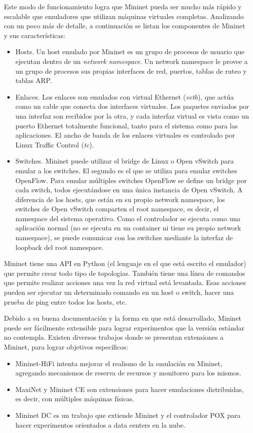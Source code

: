 Este modo de funcionamiento logra que Mininet pueda ser mucho más rápido y escalable que emuladores que utilizan máquinas virtuales completas. Analizando con un poco más de detalle, a continuación se listan los componentes de Mininet y sus características:
\begin{itemize}
	\item Hosts. Un host emulado por Mininet es un grupo de procesos de usuario que ejecutan dentro de un \textit{network namespace}. Un network namespace le provee a un grupo de procesos sus propias interfaces de red, puertos, tablas de ruteo y tablas ARP.
	\item Enlaces. Los enlaces son emulados con virtual Ethernet (\textit{veth}), que actúa como un cable que conecta dos interfaces virtuales. Los paquetes enviados por una interfaz son recibidos por la otra, y cada interfaz virtual es vista como un puerto Ethernet totalmente funcional, tanto para el sistema como para las aplicaciones. El ancho de banda de los enlaces virtuales es controlado por Linux Traffic Control (\textit{tc}).
	\item Switches. Mininet puede utilizar el bridge de Linux o Open vSwitch para emular a los switches. El segundo es el que se utiliza para emular switches OpenFlow. Para emular múltiples switches OpenFlow se define un bridge por cada switch, todos ejecutándose en una única instancia de Open vSwitch. A diferencia de los hosts, que están en su propio network namespace, los switches de Open vSwitch comparten el root namespace, es decir, el namespace del sistema operativo. Como el controlador se ejecuta como una aplicación normal (no se ejecuta en un container ni tiene su propio network namespace), se puede comunicar con los switches mediante la interfaz de loopback del root namespace.
\end{itemize}

Mininet tiene una API en Python (el lenguaje en el que está escrito el emulador) que permite crear todo tipo de topologias. También tiene una línea de comandos que permite realizar acciones una vez la red virtual está levantada. Esas acciones pueden ser ejecutar un determinado comando en un host o switch, hacer una prueba de ping entre todos los hosts, etc.

Debido a su buena documentación y la forma en que está desarrollado, Mininet puede ser fácilmente extensible para lograr experimentos que la versión estándar no contempla. Existen diversos trabajos donde se presentan extensiones a Mininet, para lograr objetivos específicos:
\begin{itemize}
	\item Mininet-HiFi \cite{mininet-hifi} intenta mejorar el realismo de la emulación en Mininet, agregando mecanismos de reserva de recursos y monitoreo para los mismos.
	\item MaxiNet \cite{maxinet} y Mininet CE \cite{mininet-ce} son extensiones para hacer emulaciones distribuidas, es decir, con múltiples máquinas físicas.
	\item Mininet DC \cite{mininet-dc} es un trabajo que extiende Mininet y el controlador POX para hacer experimentos orientados a data centers en la nube.
\end{itemize}
